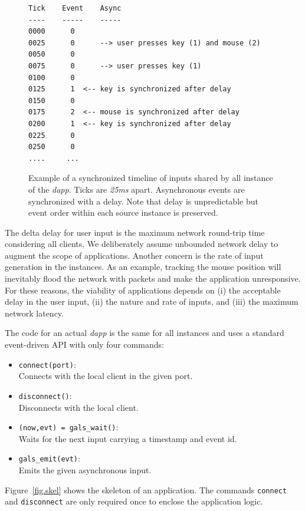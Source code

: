\documentclass[sigplan,screen]{acmart}
\begin{document}
\begin{figure}[t]
{\scriptsize
\begin{verbatim}
Tick    Event    Async
----    -----    -----
0000      0
0025      0      --> user presses key (1) and mouse (2)
0050      0
0075      0      --> user presses key (1)
0100      0
0125      1  <-- key is synchronized after delay
0150      0
0175      2  <-- mouse is synchronized after delay
0200      1  <-- key is synchronized after delay
0225      0
0250      0
....     ...
\end{verbatim}
}
  \caption{
    \label{fig.timeline}
    Example of a synchronized timeline of inputs shared by all instance of the
    \emph{dapp}.
    Ticks are \emph{25ms} apart.
    Asynchronous events are synchronized with a delay.
    Note that delay is unpredictable but event order within each source
    instance is preserved.
  }
\end{figure}

The delta delay for user input is the maximum network round-trip time
considering all clients.
We deliberately assume unbounded network delay to augment the scope of
applications.
Another concern is the rate of input generation in the instances.
As an example, tracking the mouse position will inevitably flood the network
with packets and make the application unresponsive.
For these reasons, the viability of applications depends on
    (i) the acceptable delay in the user input,
    (ii) the nature and rate of inputs, and
    (iii) the maximum network latency.

The code for an actual \emph{dapp} is the same for all instances and uses a
standard event-driven API with only four commands:
\begin{itemize}
\item \texttt{connect(port)}:            \\Connects with the local client in the given port.
\item \texttt{disconnect()}:             \\Disconnects with the local client.
\item \texttt{(now,evt) = gals\_wait()}: \\Waits for the next input carrying a timestamp and event id.
\item \texttt{gals\_emit(evt)}:          \\Emits the given asynchronous input.
\end{itemize}
Figure~\ref{fig.skel} shows the skeleton of an application.
The commands \texttt{connect} and \texttt{disconnect} are only required once to
enclose the application logic.
\end{document}
